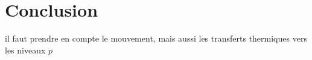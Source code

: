 %		
%		

\section*{Conclusion}
		\noindent il faut prendre en compte le mouvement, mais aussi les transferts thermiques vers les niveaux $p$
		
